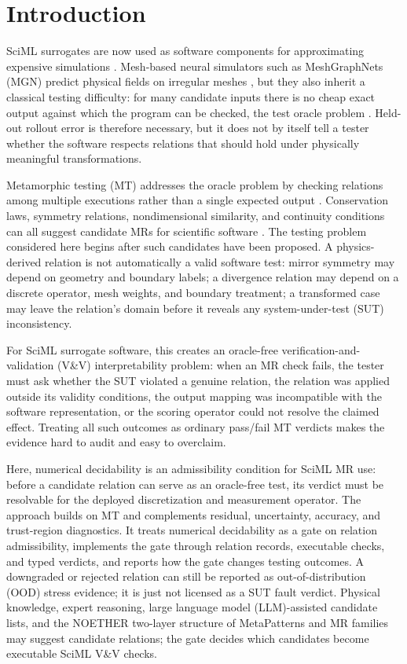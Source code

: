 \documentclass[preprint,12pt,authoryear]{elsarticle}
\begin{document}
\section{Introduction}
\label{sec:introduction}

SciML surrogates are now used as software components for approximating expensive simulations \citep{raissi2019pinn,karniadakis2021piml,li2021fno}. Mesh-based neural simulators such as MeshGraphNets (MGN) predict physical fields on irregular meshes \citep{pfaff2021meshgraphnets}, but they also inherit a classical testing difficulty: for many candidate inputs there is no cheap exact output against which the program can be checked, the test oracle problem \citep{barr2015oracle}. Held-out rollout error is therefore necessary, but it does not by itself tell a tester whether the software respects relations that should hold under physically meaningful transformations.

Metamorphic testing (MT) addresses the oracle problem by checking relations among multiple executions rather than a single expected output \citep{chen1998metamorphic,segura2016survey}. Conservation laws, symmetry relations, nondimensional similarity, and continuity conditions can all suggest candidate MRs for scientific software \citep{kanewala2019scientific,lin2020exploratory,olsen2019simulation}. The testing problem considered here begins after such candidates have been proposed. A physics-derived relation is not automatically a valid software test: mirror symmetry may depend on geometry and boundary labels; a divergence relation may depend on a discrete operator, mesh weights, and boundary treatment; a transformed case may leave the relation's domain before it reveals any system-under-test (SUT) inconsistency.

For SciML surrogate software, this creates an oracle-free verification-and-validation (V\&V) interpretability problem: when an MR check fails, the tester must ask whether the SUT violated a genuine relation, the relation was applied outside its validity conditions, the output mapping was incompatible with the software representation, or the scoring operator could not resolve the claimed effect. Treating all such outcomes as ordinary pass/fail MT verdicts makes the evidence hard to audit and easy to overclaim.

Here, numerical decidability is an admissibility condition for SciML MR use: before a candidate relation can serve as an oracle-free test, its verdict must be resolvable for the deployed discretization and measurement operator. The approach builds on MT and complements residual, uncertainty, accuracy, and trust-region diagnostics. It treats numerical decidability as a gate on relation admissibility, implements the gate through relation records, executable checks, and typed verdicts, and reports how the gate changes testing outcomes. A downgraded or rejected relation can still be reported as out-of-distribution (OOD) stress evidence; it is just not licensed as a SUT fault verdict. Physical knowledge, expert reasoning, large language model (LLM)-assisted candidate lists, and the NOETHER two-layer structure of MetaPatterns and MR families \citep{zhao2026noether} may suggest candidate relations; the gate decides which candidates become executable SciML V\&V checks.
\end{document}
